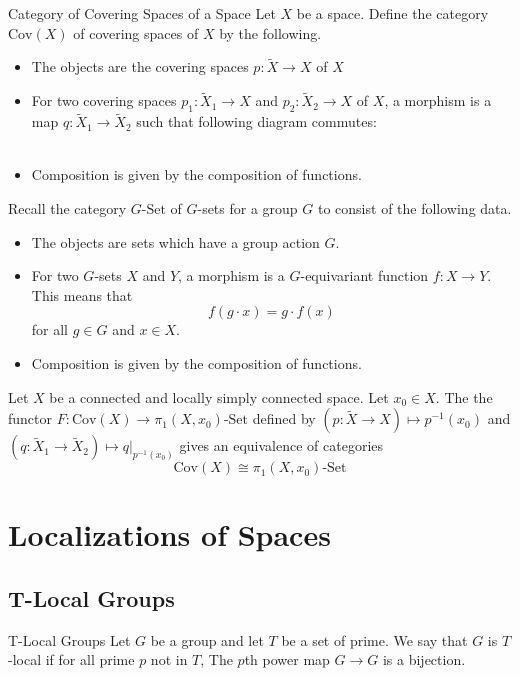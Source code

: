 \documentclass[a4paper]{article}
\begin{document}
\begin{defn}{Category of Covering Spaces of a Space}{} Let $X$ be a space. Define the category $\text{Cov}(X)$ of covering spaces of $X$ by the following. 
\begin{itemize}
\item The objects are the covering spaces $p:\tilde{X}\to X$ of $X$
\item For two covering spaces $p_1:\tilde{X}_1\to X$ and $p_2:\tilde{X}_2\to X$ of $X$, a morphism is a map $q:\tilde{X}_1\to\tilde{X}_2$ such that following diagram commutes: \\~\\
\item Composition is given by the composition of functions. 
\end{itemize}
\end{defn}

Recall the category $G\text{-Set}$ of $G$-sets for a group $G$ to consist of the following data. 
\begin{itemize}
\item The objects are sets which have a group action $G$. 
\item For two $G$-sets $X$ and $Y$, a morphism is a $G$-equivariant function $f:X\to Y$. This means that $$f(g\cdot x)=g\cdot f(x)$$ for all $g\in G$ and $x\in X$. 
\item Composition is given by the composition of functions. 
\end{itemize}

\begin{thm}{}{} Let $X$ be a connected and locally simply connected space. Let $x_0\in X$. The the functor $F:\text{Cov}(X)\to\pi_1(X,x_0)\text{-Set}$ defined by $\left(p:\tilde{X}\to X\right)\mapsto p^{-1}(x_0)$ and $\left(q:\tilde{X}_1\to\tilde{X}_2\right)\mapsto q|_{p^{-1}(x_0)}$ gives an equivalence of categories $$\text{Cov}(X)\cong\pi_1(X,x_0)\text{-Set}$$
\end{thm}

\pagebreak
\section{Localizations of Spaces}
\subsection{T-Local Groups}
\begin{defn}{T-Local Groups}{} Let $G$ be a group and let $T$ be a set of prime. We say that $G$ is $T$-local if for all prime $p$ not in $T$, The $p$th power map $G\to G$ is a bijection. 
\end{defn}
\end{document}
